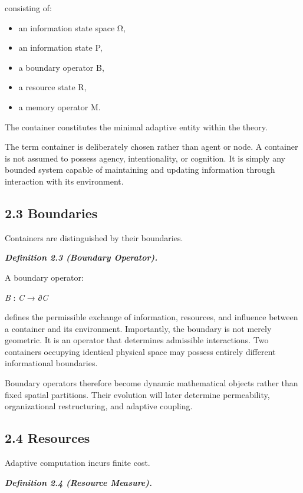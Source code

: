 \documentclass[
]{article}
\begin{document}
consisting of:

\begin{itemize}
\item
  an information state space Ω,
\item
  an information state P,
\item
  a boundary operator B,
\item
  a resource state R,
\item
  a memory operator M.
\end{itemize}

The container constitutes the minimal adaptive entity within the theory.

The term container is deliberately chosen rather than agent or node. A
container is not assumed to possess agency, intentionality, or
cognition. It is simply any bounded system capable of maintaining and
updating information through interaction with its environment.

\hypertarget{boundaries}{%
\subsection{2.3 Boundaries}\label{boundaries}}

Containers are distinguished by their boundaries.

\emph{\textbf{Definition 2.3 (Boundary Operator).}}

A boundary operator:

\emph{B} : \emph{C} → ∂\emph{C}

defines the permissible exchange of information, resources, and
influence between a container and its environment. Importantly, the
boundary is not merely geometric. It is an operator that determines
admissible interactions. Two containers occupying identical physical
space may possess entirely different informational boundaries.

Boundary operators therefore become dynamic mathematical objects rather
than fixed spatial partitions. Their evolution will later determine
permeability, organizational restructuring, and adaptive coupling.

\hypertarget{resources}{%
\subsection{2.4 Resources}\label{resources}}

Adaptive computation incurs finite cost.

\emph{\textbf{Definition 2.4 (Resource Measure).}}
\end{document}
